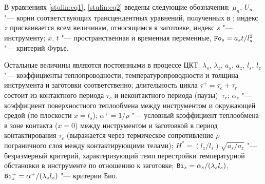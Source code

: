 В уравнениях \eqref{stulin:eq1}, \eqref{stulin:eq2} введены следующие обозначения: $\mu _n$, $U_n $ "--- корни соответствующих
трансцендентных уравнений, полученных в \cite{stulin:bib1}; индекс
$z$ присваивается всем величинам, относящимся к заготовке, индекс
$s$ "--- инструменту; $x$, $t$ "--- пространственная и временная
переменные, ${\tt Fo}_s = a_s t/ l^2_s$ "--- критерий Фурье.

Остальные величины являются постоянными в процессе ЦКТ: $\lambda_s$, $\lambda _z$, $a_s$,  $a_z$, $l_s$, $l_z$ "--- коэффициенты
теплопроводности, температуропроводности и толщина инструмента и
заготовки соответственно; длительность цикла $\tau^+=\tau _c +\tau
_r$ состоит из контактного периода $\tau _c $ и неконтактного
периода (паузы)~$\tau _r $; $\alpha _s $ "--- коэффициент
поверхностного теплообмена между инструментом и окружающей средой
(по плоскости $x=l_s$); $\alpha ^+=1/\rho $ "--- условный
коэффициент теплообмена в зоне контакта ($x=0$) между инструментом
и заготовкой в период контактирования $\tau _c $ (выражается через
термическое сопротивление $\rho$ пограничного слоя между
контактирующими телами); %
$H^\ast = (l_z/l_s)\sqrt{a_s/a_z}$ "---
безразмерный критерий, характеризующий темп перестройки
температурной обстановки в инструменте по отношению к заготовке;
${\tt Bi}_s =\alpha _s / (\lambda _s l_s )$, ${\tt Bi}_z^+ = \alpha ^+ / (\lambda _z l_z )$ "--- критерии Био.

